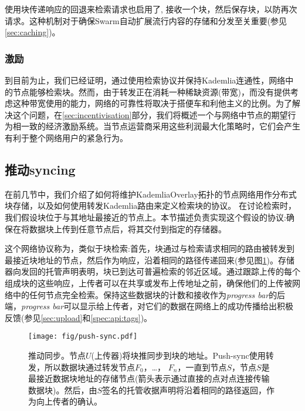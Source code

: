 使用块传递响应的回退来检索请求也启用了, 接收一个块，然后保存块，以防再次请求。这种机制对于确保Swarm自动扩展流行内容的存储和分发至关重要(参见\ref{sec:caching})。

\subsubsection{激励}

到目前为止，我们已经证明，通过使用检索协议并保持Kademlia连通性，网络中的节点能够检索块。然而，由于转发正在消耗一种稀缺资源(带宽)，而没有提供考虑这种带宽使用的能力，网络的可靠性将取决于搭便车和利他主义的比例。为了解决这个问题，在\ref{sec:incentivisation}部分，我们将概述一个与网络中节点的期望行为相一致的经济激励系统。当节点运营商采用这些利润最大化策略时，它们会产生有利于整个网络用户的紧急行为。
 
\subsection{推动syncing\statusgreen}\label{sec:push-syncing}
 
在前几节中，我们介绍了如何将维护KademliaOverlay拓扑的节点网络用作分布式块存储，以及如何使用转发Kademlia路由来定义检索块的协议。
在讨论检索时，我们假设块位于与其地址最接近的节点上。本节描述负责实现这个假设的协议:确保在将数据块上传到任意节点后，将其交付到指定的存储器。

这个网络协议称为，类似于块检索:首先，块通过与检索请求相同的路由被转发到最接近块地址的节点，然后作为响应，沿着相同的路径传递回来(参见图\ref{fig:push-syncing})。存储器向发回的托管声明表明，块已到达可普遍检索的邻近区域。通过跟踪上传的每个组成块的这些响应，上传者可以在共享或发布上传地址之前，确保他们的上传被网络中的任何节点完全检索。保持这些数据块的计数和接收作为\emph{progress bar}的后端，\emph{progress bar}可以显示给上传者，对它们的数据在网络上的成功传播给出积极反馈(参见\ref{sec:upload}和\ref{spec:api:tags})。


\begin{figure}[htbp]
   \centering
   \texttt{[image: fig/push-sync.pdf]}
   \caption[推动同步\statusgreen]{推动同步。节点$U$(上传器)将块推同步到块的地址。Push-sync使用转发，所以数据块通过转发节点$F_0$，…， $F_n$，一直到节点$S$，节点$S$是最接近数据块地址的存储节点(箭头表示通过直接的点对点连接传输数据块)。然后，由$S$签名的托管收据声明将沿着相同的路径返回，作为向上传者的确认。}
   \label{fig:push-syncing}
\end{figure}

